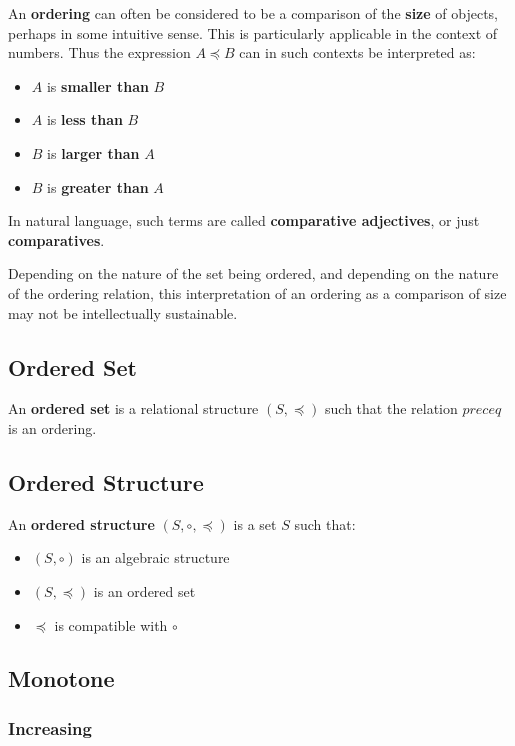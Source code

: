 An \textbf{ordering} can often be considered to be a comparison of the
\textbf{size} of objects, perhaps in some intuitive sense. This is
particularly applicable in the context of numbers. Thus the expression
$A \preceq B$ can in such contexts be interpreted as:
\begin{itemize}
\item $A$ is \textbf{smaller than} $B$
\item $A$ is \textbf{less than} $B$
\item $B$ is \textbf{larger than} $A$
\item $B$ is \textbf{greater than} $A$
\end{itemize}

In natural language, such terms are called \textbf{comparative
  adjectives}, or just \textbf{comparatives}.

Depending on the nature of the set being ordered, and depending on the
nature of the ordering relation, this interpretation of an ordering as
a comparison of size may not be intellectually sustainable.

\subsection{Ordered Set}
\label{sec:ordered-set}

An \textbf{ordered set} is a relational structure $(S, \preceq)$ such
that the relation $preceq$ is an ordering.


\subsection{Ordered Structure}
\label{sec:ordered-structure}

An \textbf{ordered structure} $(S, \circ, \preceq)$ is a set $S$ such
that:

\begin{itemize}
\item $(S, \circ)$ is an algebraic structure
\item $(S, \preceq)$ is an ordered set
\item $\preceq$ is compatible with $\circ$
\end{itemize}


\subsection{Monotone}

\subsubsection{Increasing}
\label{sec:increasing}


